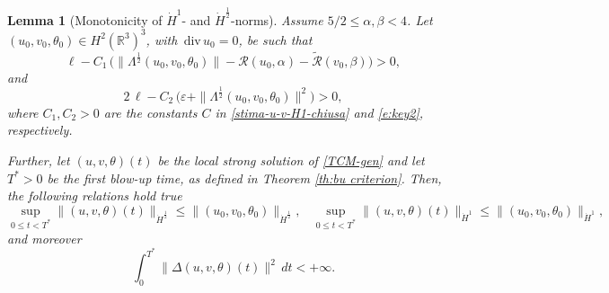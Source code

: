 \documentclass[10pt,a4paper]{amsart}
\newtheorem{lem}{Lemma}
\providecommand{\dv}{\,\mathrm{div}\,}
\begin{document}
\begin{lem}[Monotonicity of $\dot H^1$- and $\dot H^{\frac12}$-norms]\label{lem:monotone}
  Assume $5/2 \le \alpha, \beta <4$. Let $(u_0, v_0, \theta_0)\in H^2(\mathbb{R}^3)^3$,
  with $\dv u_0 =0$, be such that
   \begin{equation} \label{e:keyii1}
   \ell - C_1\, \big(\|\Lambda^{\frac{1}{2}} (u_0, v_0, \theta_0)  \| -
    \mathcal R(u_0,\alpha) - \tilde{\mathcal R}(v_0,\beta) \big) >0,
    \end{equation}
    and
    \begin{equation} \label{e:keyii2} 2\, \ell - C_2\,\big(\varepsilon
      + \|\Lambda^{\frac{1}{2}} (u_0,v_0,\theta_0)\|^2\big) >0,
    \end{equation}
    where $C_1, C_2>0$ are the constants $C$ in
    \eqref{stima-u-v-H1-chiusa} and \eqref{e:key2}, respectively.
  
    Further, let $(u,v,\theta)(t)$ be the local strong solution of
    \eqref{TCM-gen} and let $T^\ast>0$ be  the first blow-up
    time, as defined in Theorem \ref{th:bu criterion}.
    Then, the following relations hold true
    \begin{equation}
      \label{e:monotonicity1}
      \sup_{0\leq t <T^\ast} \|(u,v,\theta)(t)\|_{\dot H^{\frac12}}
      \le \|(u_0,v_0,\theta_0)\|_{\dot H^{\frac12}}, \ \ \ \
      \sup_{0\leq t <T^\ast} \|(u,v,\theta)(t)\|_{\dot H^1} \le \|(u_0,v_0,\theta_0)\|_{\dot H^1},
    \end{equation}
    and moreover
    \begin{equation}
      \label{e:integrability1}
      \int_{0}^{T^\ast} \|\Delta (u,v,\theta)(t)\|^2\, dt < +\infty.
    \end{equation}
  \end{lem}
\end{document}

